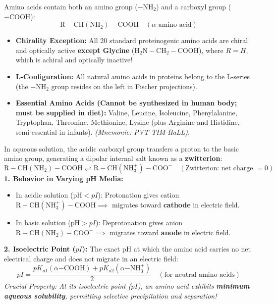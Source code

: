 \documentclass[10pt,a4paper]{article}
\begin{document}
\begin{conceptbox}
Amino acids contain both an amino group ($-\mathrm{NH_2}$) and a carboxyl group ($-\mathrm{COOH}$):
\begin{equation}
  \mathrm{R-CH(NH_2)-COOH} \quad (\alpha\text{-amino acid})
\end{equation}
\begin{itemize}
  \item \textbf{Chirality Exception:} All 20 standard proteinogenic amino acids are chiral and optically active \textbf{except Glycine} ($\mathrm{H_2N-CH_2-COOH}$), where $R=H$, which is achiral and optically inactive!
  \item \textbf{L-Configuration:} All natural amino acids in proteins belong to the L-series (the $-\mathrm{NH_2}$ group resides on the left in Fischer projections).
  \item \textbf{Essential Amino Acids (Cannot be synthesized in human body; must be supplied in diet):}
  Valine, Leucine, Isoleucine, Phenylalanine, Tryptophan, Threonine, Methionine, Lysine (plus Arginine and Histidine, semi-essential in infants). \textit{(Mnemonic: PVT TIM HaLL)}.
\end{itemize}
\end{conceptbox}

\begin{formulabox}
In aqueous solution, the acidic carboxyl group transfers a proton to the basic amino group, generating a dipolar internal salt known as a \textbf{zwitterion}:
\begin{equation}
  \mathrm{R-CH(NH_2)-COOH} \rightleftharpoons \mathbf{\mathrm{R-CH(NH_3^+)-COO^-}} \quad (\text{Zwitterion: net charge } = 0)
\end{equation}
\textbf{1. Behavior in Varying pH Media:}
\begin{itemize}
  \item In acidic solution ($\text{pH} < pI$): Protonation gives cation $\mathrm{R-CH(NH_3^+)-COOH} \implies$ migrates toward \textbf{cathode} in electric field.
  \item In basic solution ($\text{pH} > pI$): Deprotonation gives anion $\mathrm{R-CH(NH_2)-COO^-} \implies$ migrates toward \textbf{anode} in electric field.
\end{itemize}
\textbf{2. Isoelectric Point ($pI$):} The exact pH at which the amino acid carries no net electrical charge and does not migrate in an electric field:
\begin{equation}
  pI = \frac{pK_{a1} (\alpha\mathrm{-COOH}) + pK_{a2} (\alpha\mathrm{-NH_3^+})}{2} \quad (\text{for neutral amino acids})
\end{equation}
\textit{Crucial Property: At its isoelectric point ($pI$), an amino acid exhibits \textbf{minimum aqueous solubility}, permitting selective precipitation and separation!}
\end{formulabox}
\end{document}
